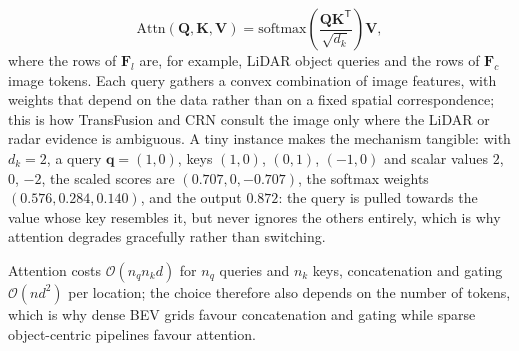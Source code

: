 \begin{list4a}
\begin{equation}
    \mathrm{Attn}(\mathbf{Q},\mathbf{K},\mathbf{V})=\mathrm{softmax}\!\left(\frac{\mathbf{Q}\mathbf{K}^{\mathsf T}}{\sqrt{d_k}}\right)\mathbf{V},
    \label{eq:cross-attention}
    \end{equation}
    where the rows of $\mathbf{F}_l$ are, for example, LiDAR object queries and the rows of $\mathbf{F}_c$ image tokens. Each query gathers a convex combination of image features, with weights that depend on the data rather than on a fixed spatial correspondence; this is how TransFusion \cite{bai2022_transfusion} and CRN \cite{kim2023_crn} consult the image only where the LiDAR or radar evidence is ambiguous. A tiny instance makes the mechanism tangible: with $d_k=2$, a query $\mathbf{q}=(1,0)$, keys $(1,0)$, $(0,1)$, $(-1,0)$ and scalar values $2$, $0$, $-2$, the scaled scores are $(0.707,0,-0.707)$, the softmax weights $(0.576,0.284,0.140)$, and the output $0.872$: the query is pulled towards the value whose key resembles it, but never ignores the others entirely, which is why attention degrades gracefully rather than switching.
\end{list4a}
Attention costs $\mathcal{O}(n_q n_k d)$ for $n_q$ queries and $n_k$ keys, concatenation and gating $\mathcal{O}(n d^{2})$ per location; the choice therefore also depends on the number of tokens, which is why dense BEV grids favour concatenation and gating while sparse object-centric pipelines favour attention.

